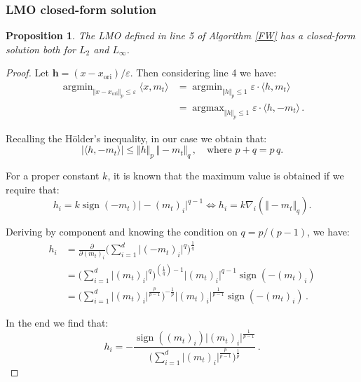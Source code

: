 \documentclass[10pt,twocolumn,letterpaper, english]{article}
\newcommand{\sign}{\mathop{\mathrm{sign}}}
\newcommand{\argmin}{\mathop{\mathrm{argmin}}}
\newcommand{\argmax}{\mathop{\mathrm{argmax}}}
\theoremstyle{definition}
\theoremstyle{plain}
\theoremstyle{plain}
\theoremstyle{plain}
\theoremstyle{plain}
\newtheorem{prop}{Proposition}[subsection]
\theoremstyle{remark}
\theoremstyle{remark}
\theoremstyle{definition}
\theoremstyle{definition}
\theoremstyle{definition}
\theoremstyle{definition}
\renewcommand{\epsilon}{\varepsilon}
\begin{document}
\subsubsection{LMO closed-form solution} \label{LMO}

\begin{prop}The LMO defined in line 5 of Algorithm \ref{FW} has a closed-form solution both for $L_2$ and $L_\infty$. \\
\end{prop}
\begin{proof}
Let $\textbf{h}=(x - x_{\text{ori}})/ \epsilon$. Then considering line 4 we have:
\begin{align*}
    \argmin_{\Vert x - x_{\text{ori}} \Vert_p \le \epsilon} \langle x, m_t \rangle &= \argmin_{\Vert h \Vert_p \le 1} \epsilon \cdot \langle h,m_t \rangle \\
    &= \argmax_{\Vert h \Vert_p \le 1} \epsilon \cdot \langle h, -m_t \rangle \,.
\end{align*}

Recalling the H\"{o}lder's inequality, in our case we obtain that: 
\begin{equation*}
    \vert \langle h, -m_t \rangle \vert \le \Vert h \Vert_p \, \Vert -m_t \Vert_q \,, \quad \text{where } p+q = p\,q.
\end{equation*}

For a proper constant $k$, it is known that the maximum value is obtained if we require that: 
\begin{equation*}
    h_i = k \sign(-m_t) \vert -(m_t)_i \vert^{q-1} 
    \iff h_i = k \nabla_i (\Vert -m_t \Vert_q) .
\end{equation*}

Deriving by component and knowing the condition on $q=p/(p-1)$, we have:
\begin{align*}
    h_i &= \frac{\partial}{\partial (m_t)_i} \Big( \sum_{i=1}^d \vert (-m_t)_i\vert^q \Big)^{\frac{1}{q}} \\
    &= \Big( \sum_{i=1}^d \vert (m_t)_i \vert^q \Big)^{(\frac{1}{q})-1} \vert (m_t)_i \vert^{q-1} \sign(-(m_t)_i)\\
    &= \Big( \sum_{i=1}^d \vert (m_t)_i \vert^{\frac{p}{p-1}} \Big)^{-\frac{1}{p}} \vert (m_t)_i \vert^{\frac{1}{p-1}} \sign(-(m_t)_i)\,.
\end{align*}

In the end we find that: 
\begin{equation*}
    h_i = - \frac{\sign((m_t)_i) \vert (m_t)_i\vert^{\frac{1}{p-1}}}{\Big( \sum_{i=1}^d \vert (m_t)_i \vert^{\frac{p}{p-1}} \Big)^\frac{1}{p}}\,.
\end{equation*}


\end{proof}
\end{document}
